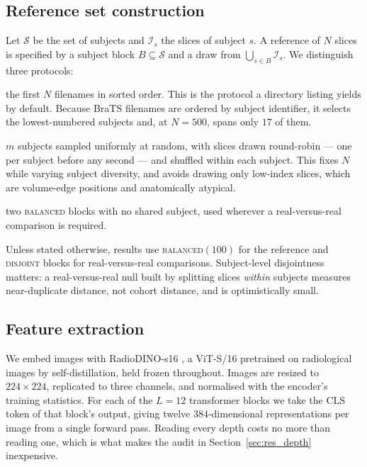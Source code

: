 \documentclass[preprint,12pt,authoryear]{elsarticle}
\begin{document}
\subsection{Reference set construction}
\label{sec:refproto}

Let $\mathcal{S}$ be the set of subjects and $\mathcal{I}_s$ the slices of
subject $s$. A reference of $N$ slices is specified by a subject block
$B \subseteq \mathcal{S}$ and a draw from $\bigcup_{s \in B}\mathcal{I}_s$. We
distinguish three protocols:

\begin{description}[leftmargin=*, topsep=2pt, itemsep=2pt]
\item[\textsc{head}] the first $N$ filenames in sorted order. This is the
      protocol a directory listing yields by default. Because BraTS filenames
      are ordered by subject identifier, it selects the lowest-numbered
      subjects and, at $N=500$, spans only $17$ of them.
\item[\textsc{balanced}$(m)$] $m$ subjects sampled uniformly at random, with
      slices drawn round-robin --- one per subject before any second --- and
      shuffled within each subject. This fixes $N$ while varying subject
      diversity, and avoids drawing only low-index slices, which are
      volume-edge positions and anatomically atypical.
\item[\textsc{disjoint}] two \textsc{balanced} blocks with no shared subject,
      used wherever a real-versus-real comparison is required.
\end{description}

Unless stated otherwise, results use \textsc{balanced}$(100)$ for the reference
and \textsc{disjoint} blocks for real-versus-real comparisons. Subject-level
disjointness matters: a real-versus-real null built by splitting slices
\emph{within} subjects measures near-duplicate distance, not cohort distance,
and is optimistically small.

\subsection{Feature extraction}
\label{sec:features}

We embed images with RadioDINO-s16 \citep{perezrad}, a ViT-S/16
pretrained on radiological images by self-distillation, held frozen throughout.
Images are resized to $224\times224$, replicated to three channels, and
normalised with the encoder's training statistics. For each of the $L=12$
transformer blocks we take the CLS token of that block's output, giving twelve
$384$-dimensional representations per image from a single forward pass. Reading
every depth costs no more than reading one, which is what makes the audit in
Section~\ref{sec:res_depth} inexpensive.
\end{document}
